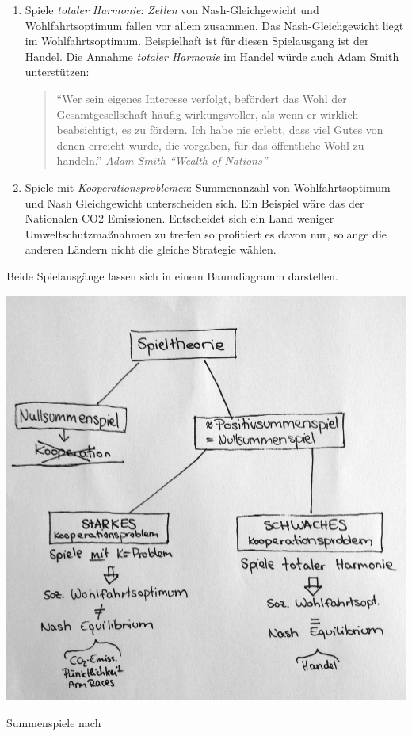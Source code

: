 \begin{enumerate}
	\item Spiele \emph{totaler Harmonie}: \emph{Zellen} von Nash-Gleichgewicht und Wohlfahrtsoptimum fallen vor allem zusammen. Das Nash-Gleichgewicht liegt im Wohlfahrtsoptimum.
	Beispielhaft ist für diesen Spielausgang ist der Handel.
	Die Annahme \emph{totaler Harmonie} im Handel würde auch Adam Smith unterstützen:

	\begin{quote}
		``Wer sein eigenes Interesse verfolgt, befördert das Wohl der Gesamtgesellschaft häufig wirkungsvoller, als wenn er wirklich beabsichtigt, es zu fördern. Ich habe nie erlebt, dass viel Gutes von denen erreicht wurde, die vorgaben, für das öffentliche Wohl zu handeln.'' \emph{Adam Smith ``Wealth of Nations''}
	\end{quote}

	\item Spiele mit \emph{Kooperationsproblemen}: Summenanzahl von Wohlfahrtsoptimum und Nash Gleichgewicht unterscheiden sich.
	Ein Beispiel wäre das der Nationalen CO2 Emissionen. Entscheidet sich ein Land weniger Umweltschutzmaßnahmen zu treffen so profitiert es davon nur, solange die anderen Ländern nicht die gleiche Strategie wählen.

\end{enumerate}

Beide Spielausgänge lassen sich in einem Baumdiagramm darstellen.

\begin{dsafigure}
	\begin{center}
	\includegraphics[width=0.9\columnwidth]{img/summenspiele.jpg}
	\caption{Summenspiele nach \cite{Kleinberg-2009-oz}}
	\label{fig:gefangenendilemma}
	\end{center}
\end{dsafigure}


